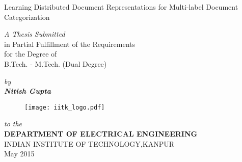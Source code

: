 \thispagestyle{empty}
\renewcommand{\baselinestretch}{1.5}
\vfill
    \begin{center}
        {\LARGE Learning Distributed Document Representations for Multi-label Document Categorization}
        \end{center}

\vfill

    \begin{center}
        {\sl A Thesis Submitted}\\
         in Partial Fulfillment of the Requirements\\
         for the Degree of\\
          {\sf B.Tech. - M.Tech. (Dual Degree)}
    \end{center}
\vspace{2.cm}
    \begin{center}
            \sl by \\
        {\bf   Nitish Gupta}
    \end{center}
\vspace*{.5cm}
\begin{figure}[ht]
    \begin{center}
    \texttt{[image: iitk\_logo.pdf]}
    \end{center}
\end{figure}
\vfill
    \begin{center}
        \baselineskip
        {\sl to the}\\
    {\bf DEPARTMENT OF ELECTRICAL ENGINEERING}\\
        {\large INDIAN INSTITUTE OF TECHNOLOGY,KANPUR}\\
        May 2015\
    \end{center}
